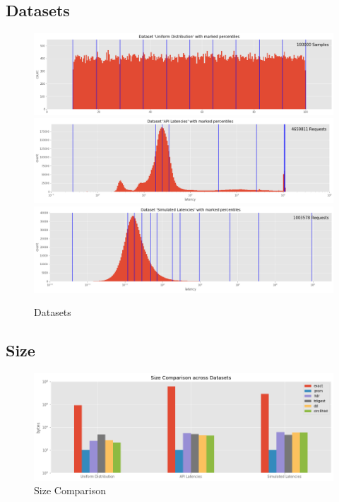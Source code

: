 \documentclass{article}
\theoremstyle{plain}
\theoremstyle{remark}
\begin{document}
\clearpage
\subsection{Datasets}

\begin{figure}
   \includegraphics[width=\textwidth]{evaluation/images/Uniform_Distribution_distribution_percentiles.png}
   \includegraphics[width=\textwidth]{evaluation/images/API_Latencies_distribution_percentiles.png}
   \includegraphics[width=\textwidth]{evaluation/images/Simulated_Latencies_distribution_percentiles.png}
   \caption{Datasets}
\end{figure}

\clearpage
\subsection{Size}

\begin{figure}[t!]
  \includegraphics[width=\textwidth]{evaluation/images/all_size.png}
  \caption{Size Comparison}
\end{figure}
\end{document}
